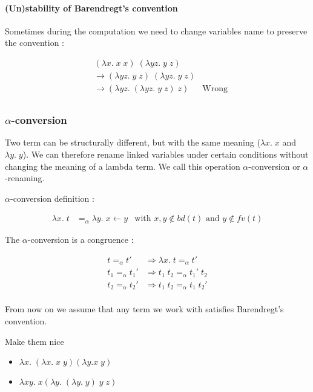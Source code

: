   \paragraph{(Un)stability of Barendregt's convention}
  Sometimes during the computation we need to change variables name to preserve
  the convention :

  \begin{align*}
    &(\lambda x.\;x\;x)\;(\lambda yz.\;y\;z)\\
    &\to (\lambda yz.\;y\;z)\;(\lambda yz.\;y\;z)\\
    &\to (\lambda yz.\;(\lambda yz.\;y\;z)\;z) & \text{Wrong}\\
  \end{align*}

  \subsubsection{$\alpha$-conversion}

  Two term can be structurally different, but with the same meaning ($\lambda
  x.\; x$ and $\lambda y.\; y$). We can therefore rename linked variables under
  certain conditions without changing the meaning of a lambda term. We call this
  operation $\alpha$-conversion or $\alpha$-renaming.

  $\alpha$-conversion definition :

  \begin{align*}
    \lambda x.\; t &=_\alpha \lambda y.\;{x \leftarrow y} & \text{with } x,y
      \not \in bd(t) \text{ and } y \not \in fv(t)
  \end{align*}

  The $\alpha$-conversion is a congruence :

  \begin{align*}
    t =_\alpha t' &\Rightarrow \lambda x.\;t =_\alpha t' \\
    t_1 =_\alpha t_1' &\Rightarrow t_1\;t_2 =_\alpha t_1'\;t_2 \\
    t_2 =_\alpha t_2' &\Rightarrow t_1\;t_2 =_\alpha t_1\;t_2' \\
  \end{align*}

  From now on we assume that any term we work with satisfies Barendregt’s
  convention.

  \exo Make them nice
    \begin{itemize}
      \item $\lambda x.\; (\lambda x.\; x\; y) (\lambda y. x\; y)$
      \item $\lambda x y.\; x (\lambda y.\; (\lambda y.\; y)\; y\; z)$
    \end{itemize}

